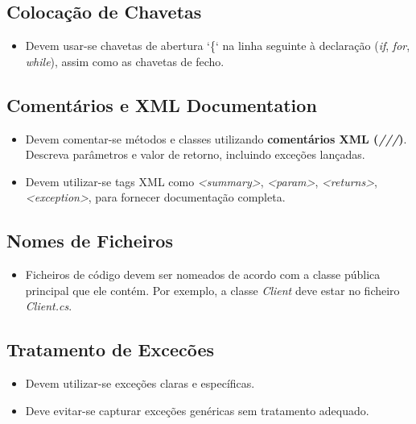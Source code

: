 \documentclass[11pt]{scrartcl} %
\begin{document}
\subsection{Colocação de Chavetas}
\begin{itemize}
	\item Devem usar-se chavetas de abertura ‘\{‘ na linha seguinte à declaração (\textit{if}, \textit{for}, \textit{while}), assim como as chavetas de fecho.
\end{itemize}

\subsection{Comentários e XML Documentation}
\begin{itemize}
	\item Devem comentar-se métodos e classes utilizando \textbf{comentários XML (\textit{///})}. Descreva parâmetros e valor de retorno, incluindo exceções lançadas.
	\item Devem utilizar-se tags XML como \textit{<summary>}, \textit{<param>}, \textit{<returns>}, \textit{<exception>}, para fornecer documentação completa.
	
\end{itemize}

\subsection{Nomes de Ficheiros}
\begin{itemize}
	\item Ficheiros de código devem ser nomeados de acordo com a classe pública principal que ele contém. Por exemplo, a classe \textit{Client} deve estar no ficheiro \textit{Client.cs}.
\end{itemize}

\subsection{Tratamento de Excecões}
\begin{itemize}
	\item Devem utilizar-se exceções claras e específicas.
	\item Deve evitar-se capturar exceções genéricas sem tratamento adequado.
\end{itemize}

\newpage
\end{document}

